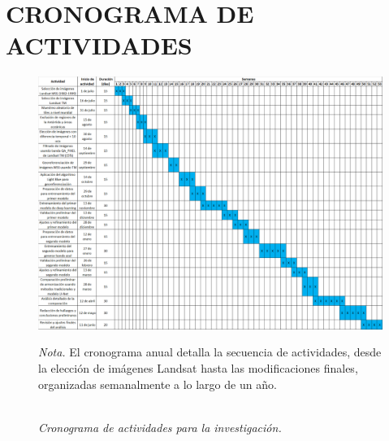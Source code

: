\Chapter{}
\chapter{CRONOGRAMA DE ACTIVIDADES}
    \begin{figure}[H] 
        \caption{\doublespacing \\ \textit{Cronograma de actividades para la investigación.}} 
        \centering
        \includegraphics[width=1.12\linewidth, angle=90]{2_CAPITULO0/IMG/cronograma.png}
        \begin{justify}
            \textit{Nota.} El cronograma anual detalla la secuencia de actividades, desde la elección de imágenes Landsat hasta las modificaciones finales, organizadas semanalmente a lo largo de un año.
        \end{justify}                    
        \label{cronograma}
    \end{figure}